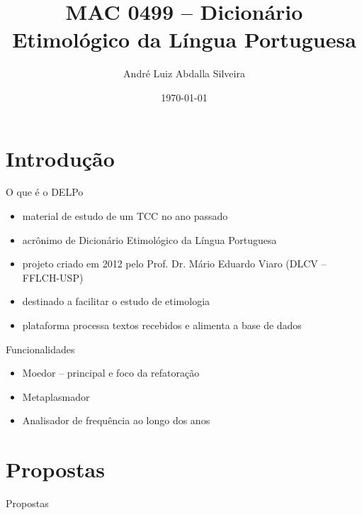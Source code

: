 \documentclass[aspectratio=43,display]{beamer}
\title[DELPo]{MAC 0499 -- Dicionário Etimológico da Língua Portuguesa}
\author{André Luiz Abdalla Silveira}
\institute{Instituto de Matemática e Estatística \\ Universidade de São Paulo}
\date{\today}
\begin{document}
  \begin{frame}
    \maketitle
  \end{frame}

  \begin{frame}
    \tableofcontents
  \end{frame}

  \section{Introdução}\label{sec:introducao}

  \begin{frame}
    \tableofcontents[currentsection]
  \end{frame}

  \begin{frame}{O que é o DELPo}
    \begin{itemize}
      \item material de estudo de um TCC no ano passado \pause
      \item acrônimo de Dicionário Etimológico da Língua Portuguesa \pause
      \item projeto criado em 2012 pelo Prof. Dr. Mário Eduardo Viaro (DLCV -- FFLCH-USP) \pause
      \item destinado a facilitar o estudo de etimologia \pause
      \item plataforma processa textos recebidos e alimenta a base de dados
    \end{itemize}
  \end{frame}

  \begin{frame}{Funcionalidades}
    \begin{itemize}
      \item Moedor -- principal e foco da refatoração \pause
      \item Metaplasmador \pause
      \item Analisador de frequência ao longo dos anos
    \end{itemize}
  \end{frame}

  \section{Propostas}\label{sec:propostas}

  \begin{frame}{Propostas}
    \tableofcontents[currentsection]
  \end{frame}
\end{document}

